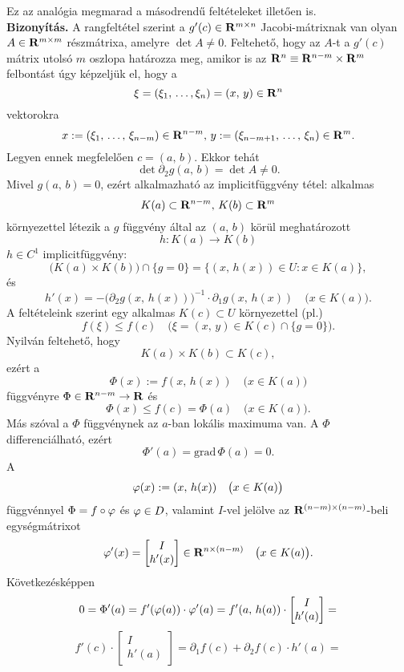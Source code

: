Ez az analógia megmarad a másodrendű feltételeket illetően is.\\

\textbf{Bizonyítás.} A rangfeltétel szerint a $g'(c) \in \mathbf{R}^{m\times n}$ Jacobi-mátrixnak van olyan $A \in \mathbf{R}^{m \times m}$ részmátrixa, amelyre $\det A \neq 0$. Feltehető, hogy az $A$-t a $g'(c)$ mátrix utolsó $m$ oszlopa határozza meg, amikor is az $\mathbf{R}^n \equiv \mathbf{R}^{n-m} \times \mathbf{R}^{m}$ felbontást úgy képzeljük el, hogy a
\[
	\xi = (\xi_1, \, \dots, \xi_n) = (x, \, y) \in \mathbf{R}^n
\]
vektorokra
\[
	x := (\xi_1, \, \dots, \, \xi_{n-m}) \in \mathbf{R}^{n-m}, \, y := (\xi_{n-m+1}, \, \dots, \, \xi_n) \in \mathbf{R}^m.
\]
Legyen ennek megfelelően $c = (a, \, b)$. Ekkor tehát
\[
	\det \partial_2g(a, \, b) = \det A \neq 0.
\]
Mivel $g(a, \, b) = 0$, ezért alkalmazható az implicitfüggvény tétel: alkalmas
\[
	K(a) \subset \mathbf{R}^{n-m}, \, K(b) \subset \mathbf{R}^m
\]
környezettel létezik a $g$ függvény által az $(a, \, b)$ körül meghatározott
\[
	h : K(a) \to K(b)
\]
$h \in C^1$ implicitfüggvény:
\[
	\big( K(a) \times K(b) \big) \cap \{ g = 0\} = \{ (x, \, h(x)) \in U : x \in K(a)\},
\]
és
\[
	h'(x) = - \big( \partial_2g(x, \, h(x)) \big)^{-1} \cdot \partial_1g(x, \, h(x)) \quad \big( x \in K(a) \big).
\]
A feltételeink szerint egy alkalmas $K(c) \subset U$ környezettel (pl.)
\[
	f(\xi) \leq f(c) \quad \big(\xi = (x, \, y) \in K(c) \cap \{g=0\}\big).
\]
Nyilván feltehető, hogy
\[
	K(a) \times K(b) \subset K(c),
\]
ezért a
\[
	\Phi(x) := f(x, \, h(x)) \quad \big( x \in K(a) \big)
\]
függvényre $\Phi \in \mathbf{R}^{n-m} \to \mathbf{R}$ és
\[
	\Phi(x) \leq f(c) = \Phi(a) \quad \big( x \in K(a) \big).
\]
Más szóval a $\Phi$ függvénynek az $a$-ban lokális maximuma van. A $\Phi$ differenciálható, ezért
\[
	\Phi'(a) = \text{grad} \, \Phi(a) = 0.
\]
A
\[
	\varphi(x) := (x, \, h(x)) \quad \big(x \in K(a)\big)
\]
függvénnyel $\Phi = f \circ \varphi$ és $\varphi \in D$, valamint $I$-vel jelölve az $\mathbf{R}^{(n-m) \times (n-m)}$-beli egységmátrixot
\[
	\varphi'(x) = \begin{bmatrix}
		I\\
		h'(x)
	\end{bmatrix} \in \mathbf{R}^{n \times (n-m)} \quad \big(x \in K(a)\big).
\]
Következésképpen
\[
	0 = \Phi'(a) = f'(\varphi(a)) \cdot \varphi'(a) = f'(a, \, h(a)) \cdot \begin{bmatrix}
		I\\
		h'(a)
	\end{bmatrix} =
\]
\[
	f'(c) \cdot \begin{bmatrix}
		I\\
		h'(a)
	\end{bmatrix} = \partial_1f(c) + \partial_2f(c) \cdot h'(a) =
\]
